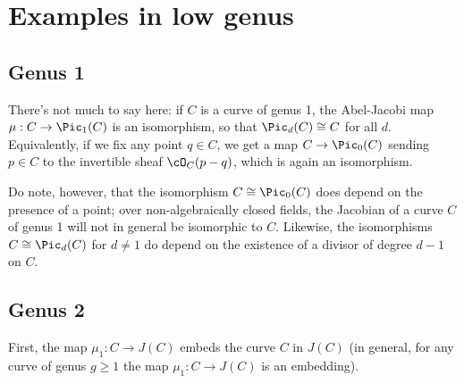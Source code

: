%
%
%
%

\section{Examples in low genus}

\subsection{Genus 1} 

There's not much to say here: if $C$ is a curve of genus 1, the Abel-Jacobi map $\mu : C \to \Pic_1(C)$ is an isomorphism, so that $\Pic_d(C) \cong C$ for all $d$. Equivalently, if we fix any point $q \in C$, we get a map $C \to \Pic_0(C)$ sending $p \in C$ to the invertible sheaf $\cO_C(p-q)$, which is again an isomorphism.

Do note, however, that the isomorphism $C \cong \Pic_0(C)$ does depend on the presence of a point; over non-algebraically closed fields, the Jacobian of a curve $C$ of genus 1 will not in general be isomorphic to $C$. Likewise, the isomorphisms $C \cong \Pic_d(C)$
for $d \neq 1$ do depend on the existence of a divisor of degree $d-1$ on $C$.

\subsection{Genus 2}

First, the map $\mu_1 : C \to J(C)$ embeds the curve $C$ in $J(C)$ (in general, for any curve of genus $g \geq 1$ the map $\mu_1 : C \to J(C)$ is an embedding). 


